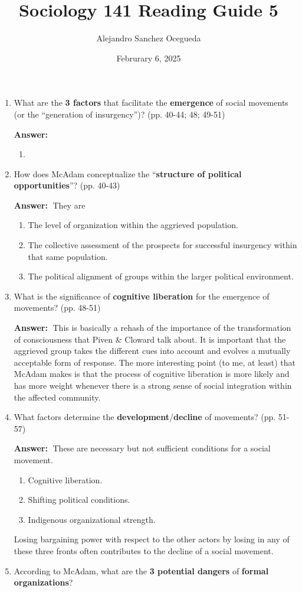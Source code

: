 \documentclass{article}
\title{Sociology 141 Reading Guide 5}
\author{Alejandro Sanchez Ocegueda}
\date{Februrary 6, 2025}
\newcommand{\answer}{\textbf{Answer:}$\;$}
\begin{document}
\maketitle

\begin{enumerate}[label=\arabic*)]
    \item What are the \textbf{3 factors} that facilitate the \textbf{emergence} of social movements (or the ``generation of insurgency'')? (pp. 40-44; 48; 49-51)
    
    \answer 
    \begin{enumerate}
        \item 
    \end{enumerate}
    
    \item How does McAdam conceptualize the ``\textbf{structure of political opportunities}''? (pp. 40-43)
    
    \answer 
    They are
    \begin{enumerate}
        \item 
        The level of organization within the aggrieved population.
        \item 
        The collective assessment of the prospects for successful insurgency within that same population.
        \item 
        The political alignment of groups within the larger political environment.
    \end{enumerate}
    
    \item What is the significance of \textbf{cognitive liberation} for the emergence of movements? (pp. 48-51) 
   
    \answer
    This is basically a rehash of the importance of the transformation of consciousness that Piven \& Cloward talk about.
    It is important that the aggrieved group takes the different cues into account and evolves a mutually acceptable form of response.
    The more interesting point (to me, at least) that McAdam makes is that the process of cognitive liberation is more likely and has more weight whenever there is a strong sense of social integration within the affected community.
     
    \item What factors determine the \textbf{development}/\textbf{decline} of movements? (pp. 51-57)
    
    \answer 
    These are necessary but not sufficient conditions for a social movement.
    \begin{enumerate}
        \item Cognitive liberation.
        \item Shifting political conditions.
        \item Indigenous organizational strength.
    \end{enumerate}
    Losing bargaining power with respect to the other actors by losing in any of these three fronts often contributes to the decline of a social movement.
    \item According to McAdam, what are the \textbf{3 potential dangers} of \textbf{formal organizations}?
    

\end{enumerate}
\end{document}
